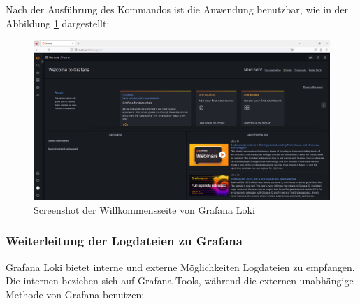 
\newpage
{}
\thispagestyle{lscape}
\begin{landscape}
   Nach der Ausführung des Kommandos ist die Anwendung benutzbar, wie in der Abbildung \ref{fig:grafana_welcome} dargestellt:
    \begin{figure}[H]
        \centerline{\includegraphics[width=1.5\textwidth]{assets/Installation_Grafana.png}}
        \caption[Screenshot der Willkommensseite von Grafana Loki]
        {Screenshot der Willkommensseite von Grafana Loki}
        \label{fig:grafana_welcome}
        \centering
    \end{figure}
\end{landscape}
\restoregeometry

\subsubsection{Weiterleitung der Logdateien zu Grafana}
Grafana Loki bietet interne und externe Möglichkeiten Logdateien zu empfangen. Die internen beziehen sich auf Grafana Tools, während die externen unabhängige Methode von Grafana benutzen:

